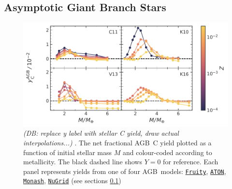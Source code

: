 \documentclass[fleqn,
usenatbib]{mnras}
\newcommand{\fruity}{\texttt{\hyperlink{fruity}{Fruity}}}
\newcommand{\nugrid}{\texttt{\hyperlink{nugrid}{NuGrid}}}
\newcommand{\monash}{\texttt{\hyperlink{monash}{Monash}}}
\newcommand{\aton}{\texttt{\hyperlink{aton}{ATON}}}
\newcommand{\agb}{AGB}
\newcommand{\y}{Y}
\newcommand{\dbnote}[1]{ {\color{Thistle} \textit{\small (DB: #1)}} }
\begin{document}
\subsection{Asymptotic Giant Branch Stars}\label{sec:agb}


\begin{figure}
    \centering
 	    \includegraphics[scale=1]{agb_yields.pdf}
        \caption[]{\dbnote{replace y label with stellar C yield, draw actual interpolations...}. The net fractional \agb\ C yield  plotted as a function of initial stellar mass $M$ and colour-coded according to metallicity. The black dashed line shows $\y=0$ for reference. Each panel represents yields from one of four \agb\ models: \fruity{}, \aton{}, \monash{}, \nugrid{} (see sections \ref{sec:agb}) }

        \label{fig:y_agb}
\end{figure}
\end{document}
